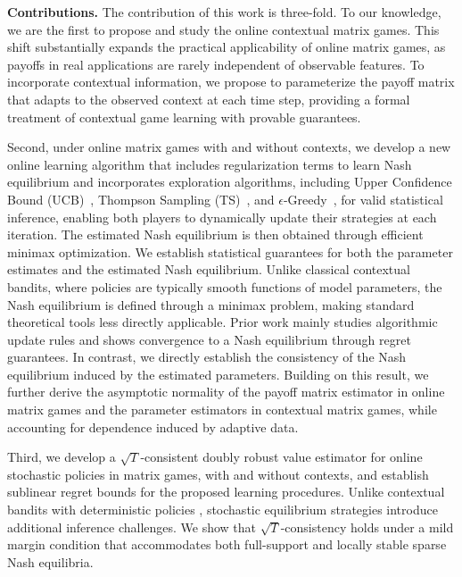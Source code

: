 \documentclass[12pt]{article}
\begin{document}
\textbf{Contributions.} The contribution of this work is three-fold. To our knowledge, %
we are the first to propose and study the online contextual matrix games. This shift substantially expands the practical applicability of online matrix games, as payoffs in real applications are rarely independent of observable features. To incorporate contextual information, we propose to parameterize the payoff matrix that adapts to the observed context at each time step, providing a formal treatment of contextual game learning with provable guarantees. 


Second, under online matrix games with and without contexts, we develop a new online learning algorithm that includes regularization terms to learn Nash equilibrium and incorporates exploration algorithms, including Upper Confidence Bound (UCB)~\citep{li2011unbiased}, Thompson Sampling (TS)~\citep{agrawal2013thompson}, and $\epsilon$-Greedy~\citep{watkins1989learning,sutton1998reinforcement}, for valid statistical inference, enabling both players to dynamically update their strategies at each iteration.
The estimated Nash equilibrium is then obtained through efficient minimax optimization. We establish statistical guarantees for both the parameter estimates and the estimated Nash equilibrium. Unlike classical contextual bandits, where policies are typically smooth functions of model parameters, the Nash equilibrium is defined through a minimax problem, making standard theoretical tools less directly applicable. Prior work mainly studies algorithmic update rules and shows convergence to a Nash equilibrium through regret guarantees. In contrast, we directly establish the consistency of the Nash equilibrium induced by the estimated parameters. Building on this result, we further derive the asymptotic normality of the payoff matrix estimator in online matrix games and the parameter estimators in contextual matrix games, while accounting for dependence induced by adaptive data.


Third, we develop a $\sqrt{T}$-consistent doubly robust value estimator for online stochastic policies in matrix games, with and without contexts, and establish sublinear regret bounds for the proposed learning procedures. Unlike contextual bandits with deterministic policies \citep{shen2024doubly}, stochastic equilibrium strategies introduce additional inference challenges. We show that $\sqrt{T}$-consistency holds under a mild margin condition that accommodates both full-support and locally stable sparse Nash equilibria.
\end{document}
